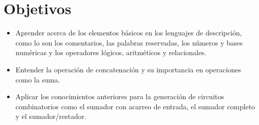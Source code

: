 \section{Objetivos \label{sec:obj}}


\begin{itemize} 
	\item Aprender acerca de los elementos básicos en los lenguajes de descripción, como lo son los comentarios, las palabras reservadas, los números y bases numéricas y los operadores lógicos, aritméticos y relacionales.
	
	\item Entender la operación de concatenación y su importancia en operaciones como la suma.
	
	\item Aplicar los conocimientos anteriores para la generación de circuitos combinatorios como el sumador con acarreo de entrada, el sumador completo y el sumador/restador.
\end{itemize}